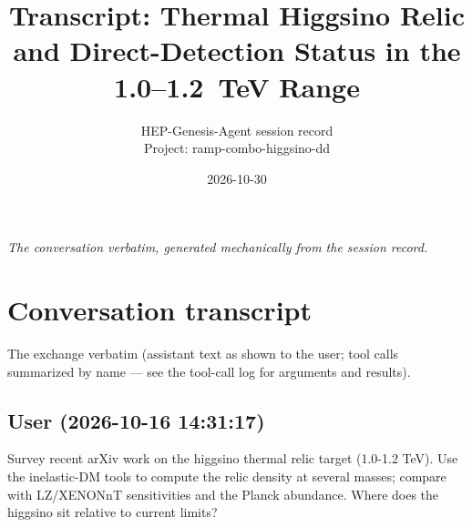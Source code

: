 \documentclass[11pt,a4paper]{article}
\title{Transcript: Thermal Higgsino Relic and Direct-Detection Status in the 1.0--1.2~TeV Range}
\author{HEP-Genesis-Agent session record \\ \small Project: ramp-combo-higgsino-dd}
\date{2026-10-30}
\begin{document}
\maketitle
\noindent\textit{\small The conversation verbatim, generated mechanically from the session record.}
\vspace{1em}



\appendix
\section{Conversation transcript}
\label{app:transcript}
The exchange verbatim (assistant text as shown to the user; tool calls summarized by name --- see the tool-call log for arguments and results).
\subsection*{User \small(2026-10-16 14:31:17)}
Survey recent arXiv work on the higgsino thermal relic target (1.0-1.2 TeV). Use the inelastic-DM tools to compute the relic density at several masses; compare with LZ/XENONnT sensitivities and the Planck abundance. Where does the higgsino sit relative to current limits?
\end{document}

